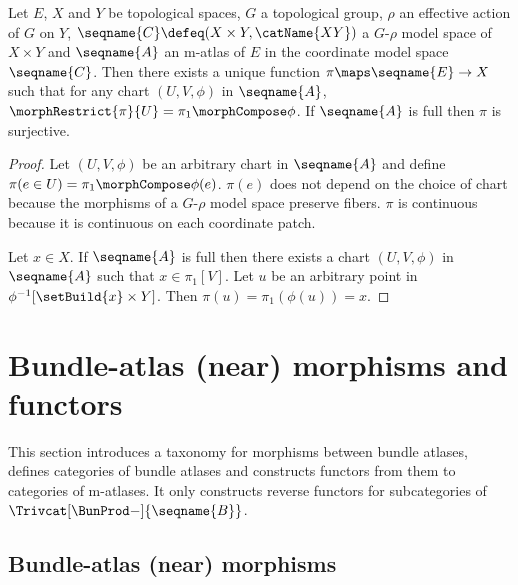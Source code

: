 \documentclass{article}
\begin{document}
\begin{lemma}
\label{lem:mGrho}
Let $E$, $X$ and $Y$ be topological spaces, $G$ a topological group,
$\rho$ an effective action of $G$ on $Y$,
$\seqname{C} \defeq (X \times Y, \catName{XY})$ a $G$-$\rho$ model space
of $X \times Y$ and $\seqname{A}$ an m-atlas of $E$ in the coordinate
model space $\seqname{C}$.  Then there exists a unique function
$\pi \maps \seqname{E} \to X$ such that for any chart $(U, V, \phi)$ in
$\seqname{A}$, $\morphRestrict{\pi}{U} = \pi_1 \morphCompose \phi$.   If
$\seqname{A}$ is full then $\pi$ is surjective.

\begin{proof}
Let $(U, V, \phi)$ be an arbitrary chart in $\seqname{A}$ and define
$\pi(e \in U) = \pi_1 \morphCompose \phi(e)$. $\pi(e)$ does not depend on the
choice of chart because the morphisms of a $G$-$\rho$ model space
preserve fibers. $\pi$ is continuous because it is continuous on each
coordinate patch.

Let $x \in X$. If $\seqname{A}$ is full then there exists a chart
$(U, V, \phi)$ in $\seqname{A}$ such that $x \in \pi_1[V]$. Let $u$ be an
arbitrary point in $\phi^{-1}[\setBuild{x} \times Y]$. Then
$\pi(u) = \pi_1(\phi(u)) = x$.
\end{proof}
\end{lemma}
\section{Bundle-atlas (near) morphisms and functors}
\label{sec:bunatlmorph}
This section introduces a taxonomy for morphisms between bundle atlases,
defines categories of bundle atlases and constructs functors from them
to categories of m-atlases.  It only constructs reverse functors for
subcategories of $\Trivcat[\BunProd-]{\seqname{B}}$.

\subsection{Bundle-atlas (near) morphisms}
\end{document}
